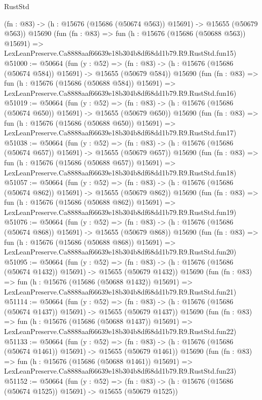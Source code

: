 \begin{lexlean}{RustStd}
\begin{coremodule}
    (fn : @83) -> (h : @15676 (@15686 (@50674 @563)) @15691) -> @15655 (@50679 @563))
    @15690
    (fun (fn : @83) =>
    fun (h : @15676 (@15686 (@50688 @563)) @15691) =>
    LexLeanPreserve.Ca8888aaf66639e18b304b8df68dd1b79.R9.RustStd.fun15)
@51000 := @50664
    (fun (y : @52) =>
    (fn : @83) -> (h : @15676 (@15686 (@50674 @584)) @15691) -> @15655 (@50679 @584))
    @15690
    (fun (fn : @83) =>
    fun (h : @15676 (@15686 (@50688 @584)) @15691) =>
    LexLeanPreserve.Ca8888aaf66639e18b304b8df68dd1b79.R9.RustStd.fun16)
@51019 := @50664
    (fun (y : @52) =>
    (fn : @83) -> (h : @15676 (@15686 (@50674 @650)) @15691) -> @15655 (@50679 @650))
    @15690
    (fun (fn : @83) =>
    fun (h : @15676 (@15686 (@50688 @650)) @15691) =>
    LexLeanPreserve.Ca8888aaf66639e18b304b8df68dd1b79.R9.RustStd.fun17)
@51038 := @50664
    (fun (y : @52) =>
    (fn : @83) -> (h : @15676 (@15686 (@50674 @657)) @15691) -> @15655 (@50679 @657))
    @15690
    (fun (fn : @83) =>
    fun (h : @15676 (@15686 (@50688 @657)) @15691) =>
    LexLeanPreserve.Ca8888aaf66639e18b304b8df68dd1b79.R9.RustStd.fun18)
@51057 := @50664
    (fun (y : @52) =>
    (fn : @83) -> (h : @15676 (@15686 (@50674 @862)) @15691) -> @15655 (@50679 @862))
    @15690
    (fun (fn : @83) =>
    fun (h : @15676 (@15686 (@50688 @862)) @15691) =>
    LexLeanPreserve.Ca8888aaf66639e18b304b8df68dd1b79.R9.RustStd.fun19)
@51076 := @50664
    (fun (y : @52) =>
    (fn : @83) -> (h : @15676 (@15686 (@50674 @868)) @15691) -> @15655 (@50679 @868))
    @15690
    (fun (fn : @83) =>
    fun (h : @15676 (@15686 (@50688 @868)) @15691) =>
    LexLeanPreserve.Ca8888aaf66639e18b304b8df68dd1b79.R9.RustStd.fun20)
@51095 := @50664
    (fun (y : @52) =>
    (fn : @83) -> (h : @15676 (@15686 (@50674 @1432)) @15691) -> @15655 (@50679 @1432))
    @15690
    (fun (fn : @83) =>
    fun (h : @15676 (@15686 (@50688 @1432)) @15691) =>
    LexLeanPreserve.Ca8888aaf66639e18b304b8df68dd1b79.R9.RustStd.fun21)
@51114 := @50664
    (fun (y : @52) =>
    (fn : @83) -> (h : @15676 (@15686 (@50674 @1437)) @15691) -> @15655 (@50679 @1437))
    @15690
    (fun (fn : @83) =>
    fun (h : @15676 (@15686 (@50688 @1437)) @15691) =>
    LexLeanPreserve.Ca8888aaf66639e18b304b8df68dd1b79.R9.RustStd.fun22)
@51133 := @50664
    (fun (y : @52) =>
    (fn : @83) -> (h : @15676 (@15686 (@50674 @1461)) @15691) -> @15655 (@50679 @1461))
    @15690
    (fun (fn : @83) =>
    fun (h : @15676 (@15686 (@50688 @1461)) @15691) =>
    LexLeanPreserve.Ca8888aaf66639e18b304b8df68dd1b79.R9.RustStd.fun23)
@51152 := @50664
    (fun (y : @52) =>
    (fn : @83) -> (h : @15676 (@15686 (@50674 @1525)) @15691) -> @15655 (@50679 @1525))

\end{coremodule}
\end{lexlean}
